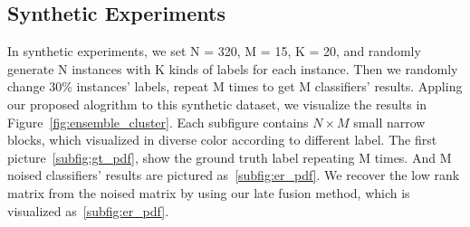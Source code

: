 \documentclass[letterpaper]{article}
\begin{document}
\subsection{Synthetic Experiments}

In synthetic experiments, we set N = 320, M = 15, K = 20, and randomly generate N instances with K kinds of labels for each instance. Then we randomly change 30\% instances' labels, repeat M times to get M classifiers' results. 
Appling our proposed alogrithm to this synthetic dataset, we visualize the results in Figure~\ref{fig:ensemble_cluster}.
Each subfigure contains $N\times M$ small narrow blocks, which visualized in diverse color according to different label. 
The first picture~\ref{subfig:gt_pdf}, show the ground truth label repeating M times. 
And M noised classifiers' results are pictured as~\ref{subfig:er_pdf}. 
We recover the low rank matrix from the noised matrix by using our late fusion method, which is visualized as~\ref{subfig:er_pdf}.
\end{document}
